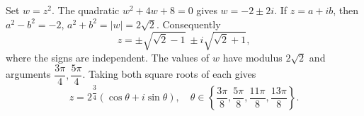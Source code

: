 Set $w=z^2$. The quadratic $w^2+4w+8=0$ gives $w=-2\pm2i$. If $z=a+ib$, then $a^2-b^2=-2$, $a^2+b^2=|w|=2\sqrt2$. Consequently
\[
\boxed{z=\pm\sqrt{\sqrt2-1}\ \pm i\sqrt{\sqrt2+1}},
\]
where the signs are independent. The values of $w$ have modulus $2\sqrt2$ and arguments $\dfrac{3\pi}{4},\dfrac{5\pi}{4}$. Taking both square roots of each gives
\[
\boxed{z=2^{\dfrac{3}{4}}(\cos\theta+i\sin\theta),\quad
\theta\in\left\{\dfrac{3\pi}{8},\dfrac{5\pi}{8},\dfrac{11\pi}{8},\dfrac{13\pi}{8}\right\}.}
\]
